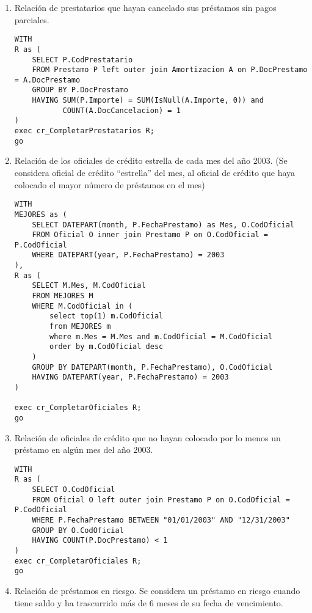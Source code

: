 \begin{enumerate}
\item Relación de prestatarios que hayan cancelado sus préstamos sin pagos parciales.

\begin{verbatim}
WITH
R as (
    SELECT P.CodPrestatario
    FROM Prestamo P left outer join Amortizacion A on P.DocPrestamo = A.DocPrestamo
    GROUP BY P.DocPrestamo
    HAVING SUM(P.Importe) = SUM(IsNull(A.Importe, 0)) and
           COUNT(A.DocCancelacion) = 1
)
exec cr_CompletarPrestatarios R;
go
\end{verbatim}

\item Relación de los oficiales de crédito estrella de cada mes del año 2003.
(Se considera oficial de crédito “estrella” del mes, al oficial de crédito
que haya colocado el mayor número de préstamos en el mes)

\begin{verbatim}
WITH
MEJORES as (
    SELECT DATEPART(month, P.FechaPrestamo) as Mes, O.CodOficial
    FROM Oficial O inner join Prestamo P on O.CodOficial = P.CodOficial
    WHERE DATEPART(year, P.FechaPrestamo) = 2003
),
R as (
    SELECT M.Mes, M.CodOficial
    FROM MEJORES M
    WHERE M.CodOficial in (
        select top(1) m.CodOficial
        from MEJORES m
        where m.Mes = M.Mes and m.CodOficial = M.CodOficial
        order by m.CodOficial desc
    )
    GROUP BY DATEPART(month, P.FechaPrestamo), O.CodOficial
    HAVING DATEPART(year, P.FechaPrestamo) = 2003
)

exec cr_CompletarOficiales R;
go
\end{verbatim}

\item Relación de oficiales de crédito que no hayan colocado por lo menos un
préstamo en algún mes del año 2003.

\begin{verbatim}
WITH
R as (
    SELECT O.CodOficial
    FROM Oficial O left outer join Prestamo P on O.CodOficial = P.CodOficial
    WHERE P.FechaPrestamo BETWEEN "01/01/2003" AND "12/31/2003"
    GROUP BY O.CodOficial
    HAVING COUNT(P.DocPrestamo) < 1
)
exec cr_CompletarOficiales R;
go
\end{verbatim}

\item Relación de préstamos en riesgo. Se considera un préstamo en riesgo cuando
tiene saldo y ha trascurrido más de 6 meses de su fecha de vencimiento.


\end{enumerate}
